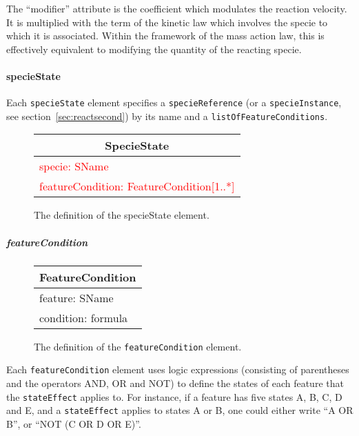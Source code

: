 \documentclass{cekarticle}
\begin{document}
The ``modifier'' attribute is the coefficient which modulates the reaction
velocity.  It is multiplied with the term of the kinetic law which involves the
specie to which it is associated.  Within the framework of the mass action law,
this is effectively equivalent to modifying the quantity of the reacting specie.

\paragraph{specieState}

Each \texttt{specieState} element specifies a \texttt{specieReference} (or a
\texttt{specieInstance}, see section~\ref{sec:reactsecond}) by its name and a
\texttt{listOfFeatureConditions}.

\begin{figure}[h]
  \vspace*{8pt}
  \centering
  \textcolor{red}{%
  \begin{tabular}{|l|}
    \hline
    \multicolumn{1}{|c|}{\rule[-3mm]{0mm}{8mm}{\textsf{SpecieState}}}\\
    \hline
    \rule[0mm]{0mm}{5mm}{\textsf{\small \textcolor{red}{specie: SName }}}\\
    \rule[-3mm]{0mm}{5mm}{\textsf{\small \textcolor{red}{featureCondition: FeatureCondition[1..*] }}}\\
    \hline
  \end{tabular}
}
  \caption{The definition of the specieState element.}
  \label{fig:speciestate}
\end{figure}

\subparagraph{featureCondition}

\begin{figure}[h]
  \vspace*{8pt}
  \centering
  \textcolor{red}{%
  \begin{tabular}{|l|}
    \hline
    \multicolumn{1}{|c|}{\rule[-3mm]{0mm}{8mm}{\textsf{FeatureCondition}}}\\
    \hline
    \rule[0mm]{0mm}{5mm}{\textsf{\small feature: SName }}\\
    \rule[-3mm]{0mm}{5mm}{\textsf{\small condition: formula }}\\
    \hline
  \end{tabular}
}
  \caption{The definition of the \texttt{featureCondition} element.}
  \label{fig:featurecondition}
\end{figure}

Each \texttt{featureCondition} element uses logic expressions (consisting of
parentheses and the operators AND, OR and NOT) to define the states of each
feature that the \texttt{stateEffect} applies to.  For instance, if a feature
has five states A, B, C, D and E, and a \texttt{stateEffect} applies to states A
or B, one could either write ``A OR B'', or ``NOT (C OR D OR E)''.
\end{document}
